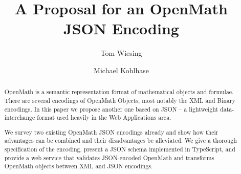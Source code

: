 \documentclass[12pt]{article}
\title{A Proposal for an OpenMath JSON Encoding}
\author{Tom Wiesing\and Michael Kohlhase}
\begin{document}
\maketitle

\begin{abstract}
  OpenMath is a semantic representation format of mathematical objects and formulae.
  There are several encodings of OpenMath Objects, most notably the XML and Binary encodings. 
  In this paper we propose another one based on JSON -- a lightweight data-interchange format used heavily in the Web Applications area. 
  
  We survey two existing OpenMath JSON encodings already and show how their advantages can be combined and their disadvantages be alleviated. 
  We give a thorough specification of the encoding, present a JSON schema implemented in TypeScript, and provide a web service that validates JSON-encoded OpenMath and transforms OpenMath objects between XML and JSON encodings.
\end{abstract}
    






\printbibliography
\end{document}
